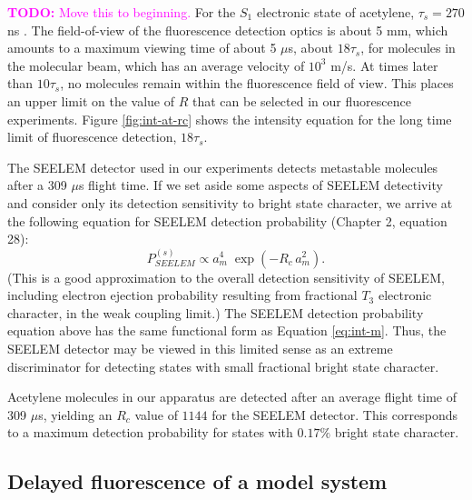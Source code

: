 \documentclass[12pt,draft]{mitthesis}
\newcommand{\TODO} [1]{\textcolor{magenta}{\textbf{TODO:} #1}}
\begin{document}
\TODO{Move this to beginning.}  For the $S_1$ electronic state of
acetylene, $\tau_s=270$ ns \cite{ochi91}.  The field-of-view of the
fluorescence detection optics is about 5 mm, which amounts to a
maximum viewing time of about 5 $\mu$s, about $18\tau_s$, for
molecules in the molecular beam, which has an average velocity of
$10^3$ m/s.  At times later than $10\tau_s$, no molecules remain
within the fluorescence field of view.  This places an upper limit on
the value of $R$ that can be selected in our fluorescence experiments.
Figure \ref{fig:int-at-rc} shows the intensity equation for the long
time limit of fluorescence detection, $18\tau_s$.

The SEELEM detector used in our experiments detects metastable
molecules after a 309 $\mu$s flight time.  If we set aside some
aspects of SEELEM detectivity and consider only its detection
sensitivity to bright state character, we arrive at the following
equation for SEELEM detection probability (Chapter 2, equation 28):
\begin{equation}
  \label{eq:seelem-prob-s}
  P_{SEELEM}^{(s)} \propto a_m^4 \; \exp \left( -R_c \, a_m^2 \right).
\end{equation}
(This is a good approximation to the overall detection sensitivity of
SEELEM, including electron ejection probability resulting from
fractional $T_3$ electronic character, in the weak coupling limit.)
The SEELEM detection probability equation above has the same
functional form as Equation \ref{eq:int-m}.  Thus, the SEELEM detector
may be viewed in this limited sense as an extreme discriminator for
detecting states with small fractional bright state character.

Acetylene molecules in our apparatus are detected after an average
flight time of 309 $\mu$s, yielding an $R_c$ value of $1144$ for the
SEELEM detector.  This corresponds to a maximum detection probability
for states with $0.17\%$ bright state character.

\subsection{Delayed fluorescence of a model system}
\end{document}
